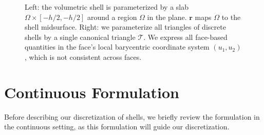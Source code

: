 \documentclass[timestamp,acmtog]{acmart}
\newcommand{\br}{\mathbf{r}}
\newcommand{\bff}{\mathbf{f}}
\newcommand{\hn}{\hat{\mathbf{n}}}
\begin{document}
\begin{figure}
\caption{Left: the volumetric shell is parameterized by a slab $\Omega \times [-h/2,-h/2]$ around a region $\Omega$ in the plane. $\br$ maps $\Omega$ to the shell midsurface. Right: we parameterize all triangles of discrete shells by a single canonical triangle $\mathcal{T}$. We express all face-based quantities in the face's local barycentric coordinate system $(u_1,u_2)$, which is not consistent across faces.}
\label{fig:technical}
\end{figure}
\section{Continuous Formulation} \label{sec:continuous}
Before describing our discretization of shells, we briefly review the formulation in the continuous setting, as this formulation will guide our discretization. 
\end{document}

